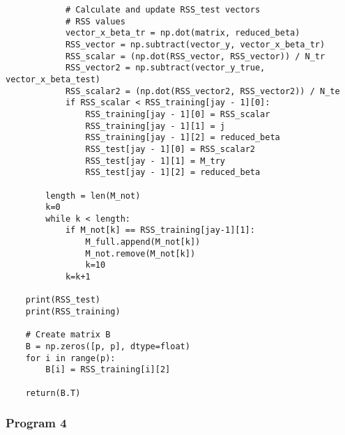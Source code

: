 \documentclass{article}
\begin{document}
\begin{lstlisting}
            # Calculate and update RSS_test vectors
            # RSS values
            vector_x_beta_tr = np.dot(matrix, reduced_beta)
            RSS_vector = np.subtract(vector_y, vector_x_beta_tr)
            RSS_scalar = (np.dot(RSS_vector, RSS_vector)) / N_tr
            RSS_vector2 = np.subtract(vector_y_true, vector_x_beta_test)
            RSS_scalar2 = (np.dot(RSS_vector2, RSS_vector2)) / N_te
            if RSS_scalar < RSS_training[jay - 1][0]:
                RSS_training[jay - 1][0] = RSS_scalar
                RSS_training[jay - 1][1] = j
                RSS_training[jay - 1][2] = reduced_beta
                RSS_test[jay - 1][0] = RSS_scalar2
                RSS_test[jay - 1][1] = M_try
                RSS_test[jay - 1][2] = reduced_beta

        length = len(M_not)
        k=0
        while k < length:
            if M_not[k] == RSS_training[jay-1][1]:
                M_full.append(M_not[k])
                M_not.remove(M_not[k])
                k=10
            k=k+1

    print(RSS_test)
    print(RSS_training)

    # Create matrix B
    B = np.zeros([p, p], dtype=float)
    for i in range(p):
        B[i] = RSS_training[i][2]

    return(B.T)
\end{lstlisting}

\vspace{-0.5cm}
\subsubsection{Program 4}
\vspace{-0.5cm}
\label{subsec:Program 4} 
\end{document}
